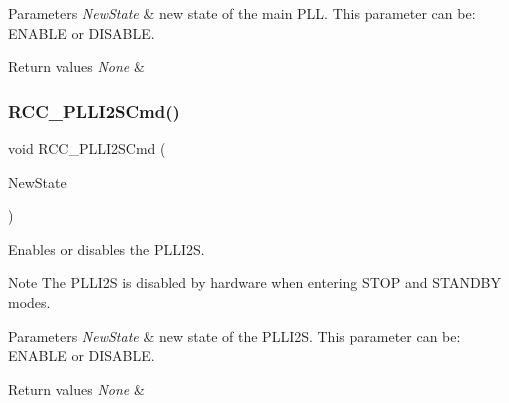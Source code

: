 \begin{DoxyParams}{Parameters}
{\em New\+State} & new state of the main P\+LL. This parameter can be\+: E\+N\+A\+B\+LE or D\+I\+S\+A\+B\+LE. \\
\hline
\end{DoxyParams}

\begin{DoxyRetVals}{Return values}
{\em None} & \\
\hline
\end{DoxyRetVals}
\mbox{\label{group___r_c_c_ga2efe493a6337d5e0034bfcdfb0f541e4}} 
\subsubsection{\texorpdfstring{R\+C\+C\+\_\+\+P\+L\+L\+I2\+S\+Cmd()}{RCC\_PLLI2SCmd()}}
{\footnotesize\ttfamily void R\+C\+C\+\_\+\+P\+L\+L\+I2\+S\+Cmd (\begin{DoxyParamCaption}\item[{Functional\+State}]{New\+State }\end{DoxyParamCaption})}



Enables or disables the P\+L\+L\+I2S. 

\begin{DoxyNote}{Note}
The P\+L\+L\+I2S is disabled by hardware when entering S\+T\+OP and S\+T\+A\+N\+D\+BY modes. ~\newline

\end{DoxyNote}

\begin{DoxyParams}{Parameters}
{\em New\+State} & new state of the P\+L\+L\+I2S. This parameter can be\+: E\+N\+A\+B\+LE or D\+I\+S\+A\+B\+LE. \\
\hline
\end{DoxyParams}

\begin{DoxyRetVals}{Return values}
{\em None} & \\
\hline
\end{DoxyRetVals}
\mbox{\label{group___r_c_c_gaf7b2c8f7533c8321dce97196d9f77fc1}} 
